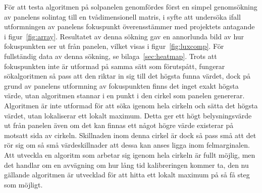             För att testa algoritmen på solpanelen genomfördes först en simpel genomsökning av panelens solintag till en tvådimensionell matris, i syfte att undersöka ifall utformningen av panelens fokuspunkt överensstämmer med projektets antagande i figur~\ref{fig:array}. Resultatet av denna sökning gav en annorlunda bild av hur fokuspunkten ser ut från panelen, vilket visas i figur~\ref{fig:luxcomp}. För fullständig data av denna sökning, se bilaga~\ref{sec:heatmap}. Trots att fokuspunkten inte är utformad på samma sätt som förutspått, fungerar sökalgoritmen så pass att den riktar in sig till det högsta funna värdet, dock på grund av panelens utformning av fokuspunkten finns det inget exakt högsta värde, utan algoritmen stannar i en punkt i den cirkel som panelen genererar. Algoritmen är inte utformad för att söka igenom hela cirkeln och sätta det högsta värdet, utan lokaliserar ett lokalt maximum. Detta ger ett högt belysningsvärde ut från panelen även om det kan finnas ett något högre värde existerar på motsatt sida av cirkeln. Skillnaden inom denna cirkel är dock så pass små att det rör sig om så små värdeskillnader att dessa kan anses ligga inom felmarginalen. Att utveckla en algoritm som arbetar sig igenom hela cirkeln är fullt möjlig, men det handlar om en avvägning om hur lång tid kalibreringen kommer ta, den nu gällande algoritmen är utvecklad för att hitta ett lokalt maximum på så få steg som möjligt.

